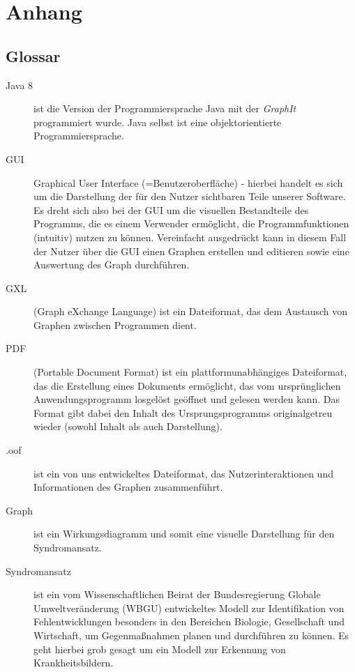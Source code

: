 \documentclass[enabledeprecatedfontcommands,fontsize=11pt,paper=a4,twoside]{scrartcl}
\newcounter{one}
\begin{document}
\section{Anhang} \label{sec:anhang}	



\subsection{Glossar}
\begin{description}
	\item[Java 8] ist die Version der Programmiersprache Java mit der \textit{GraphIt} programmiert wurde. Java selbst ist eine objektorientierte Programmiersprache. 
	\item[GUI] Graphical User Interface (=Benutzeroberfläche) - hierbei handelt es sich um die Darstellung der für den Nutzer sichtbaren Teile unserer Software. Es dreht sich also bei der GUI um die visuellen Bestandteile des Programms, die es einem Verwender ermöglicht, die Programmfunktionen (intuitiv) nutzen zu können. Vereinfacht ausgedrückt kann in diesem Fall der Nutzer über die GUI einen Graphen erstellen und editieren sowie eine Auswertung des Graph durchführen. 
	\item[GXL] (Graph eXchange Language) ist ein Dateiformat, das dem Austausch von Graphen zwischen Programmen dient. 
	\item[PDF] (Portable Document Format) ist ein plattformunabhängiges Dateiformat, das die Erstellung eines Dokuments ermöglicht, das vom ursprünglichen Anwendungsprogramm losgelöst geöffnet und gelesen werden kann. Das Format gibt dabei den Inhalt des Ursprungsprogramms originalgetreu wieder (sowohl Inhalt als auch Darstellung). 
	\item[.oof] ist ein von uns entwickeltes Dateiformat, das Nutzerinteraktionen und Informationen des Graphen zusammenführt. 
	\item[Graph] ist ein Wirkungsdiagramm und somit eine visuelle Darstellung für den Syndromansatz.  
	\item[\hypertarget{Syndromansatz}{Syndromansatz}] ist ein vom \glqq Wissenschaftlichen Beirat der Bundesregierung Globale Umweltveränderung \grqq{} (WBGU) entwickeltes Modell zur Identifikation von Fehlentwicklungen besonders in den Bereichen Biologie, Gesellschaft und Wirtschaft, um Gegenmaßnahmen planen und durchführen zu können. Es geht hierbei grob gesagt um ein Modell zur Erkennung von \glqq Krankheitsbildern\grqq.

\end{description}
\end{document}
